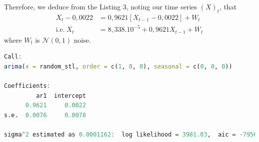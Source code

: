 Therefore, we deduce from the Listing 3, noting our time series $(X)_t$, that
\begin{align*}
X_t−0,0022 
 	&= 0,9621[X_{t-1}−0,0022] + W_t \\
\text{i.e.} \ X_t 
	&= 8,338.10^{-5} + 0,9621 X_{t-1} + W_t
\end{align*}
where $W_t$ is $\mathcal{N}(0,1)$ noise.
\begin{lstlisting}[language=R, caption=ARMA model]
Call:
arima(x = random_stl, order = c(1, 0, 0), seasonal = c(0, 0, 0))

Coefficients:
         ar1  intercept
      0.9621     0.0022
s.e.  0.0076     0.0078

sigma^2 estimated as 0.0001162:  log likelihood = 3981.03,  aic = -7956.06
\end{lstlisting}
